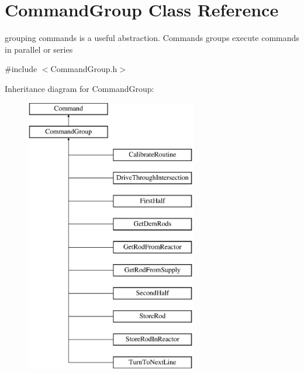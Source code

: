 \hypertarget{classCommandGroup}{\section{Command\-Group Class Reference}
\label{classCommandGroup}
}


grouping commands is a useful abstraction. Commands groups execute commands in parallel or series  




{\ttfamily \#include $<$Command\-Group.\-h$>$}

Inheritance diagram for Command\-Group\-:\begin{figure}[H]
\begin{center}
\leavevmode
\includegraphics[height=12.000000cm]{classCommandGroup}
\end{center}
\end{figure}
